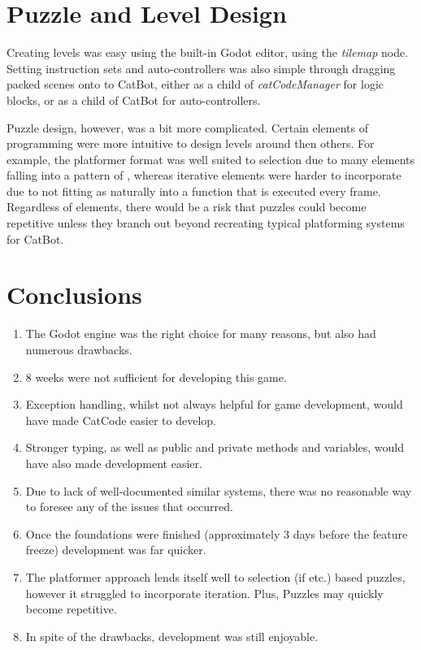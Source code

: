 \section{Puzzle and Level Design}

Creating levels was easy using the built-in Godot editor, using the \textit{tilemap} node. Setting instruction sets and auto-controllers was also simple through dragging packed scenes onto to CatBot, either as a child of \textit{catCodeManager} for logic blocks, or as a child of CatBot for auto-controllers.

Puzzle design, however, was a bit more complicated. Certain elements of programming were more intuitive to design levels around then others. For example, the platformer format was well suited to selection due to many elements falling into a pattern of , whereas iterative elements were harder to incorporate due to not fitting as naturally into a function that is executed every frame. Regardless of elements, there would be a risk that puzzles could become repetitive unless they branch out beyond recreating typical platforming systems for CatBot.

\section{Conclusions}

\begin{enumerate}
        \item The Godot engine was the right choice for many reasons, but also had numerous drawbacks.
        \item 8 weeks were not sufficient for developing this game.
        \item Exception handling, whilst not always helpful for game development, would have made CatCode easier to develop.
        \item Stronger typing, as well as public and private methods and variables, would have also made development easier.
        \item Due to lack of well-documented similar systems, there was no reasonable way to foresee any of the issues that occurred.
        \item Once the foundations were finished (approximately 3 days before the feature freeze) development was far quicker.
        \item The platformer approach lends itself well to selection (if etc.) based puzzles, however it struggled to incorporate iteration. Plus, Puzzles may quickly become repetitive.
        \item In spite of the drawbacks, development was still enjoyable.
    \end{enumerate}

